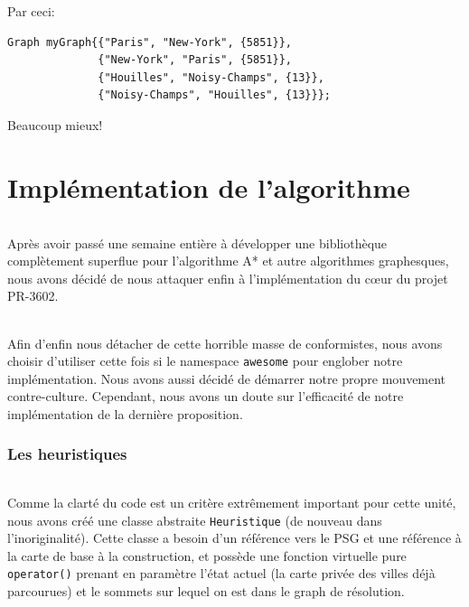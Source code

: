 \documentclass[french]{article}
\begin{document}
Par ceci:

\begin{listing}[H]
\begin{verbatim}
Graph myGraph{{"Paris", "New-York", {5851}},
              {"New-York", "Paris", {5851}},
              {"Houilles", "Noisy-Champs", {13}},
              {"Noisy-Champs", "Houilles", {13}}};
\end{verbatim}
\caption{Beaucoup mieux!}
\label{tsp:better}
\end{listing}

\part{Implémentation de l'algorithme}

\paragraph{} Après avoir passé une semaine entière à développer une
bibliothèque complètement superflue pour l'algorithme A* et autre algorithmes
graphesques, nous avons décidé de nous attaquer enfin à l'implémentation du
cœur du projet PR-3602.

\paragraph{} Afin d'enfin nous détacher de cette horrible masse de
conformistes, nous avons choisir d'utiliser cette fois si le namespace
\texttt{awesome} pour englober notre implémentation. Nous avons aussi décidé de
démarrer notre propre mouvement contre-culture. Cependant, nous avons un doute
sur l'efficacité de notre implémentation de la dernière proposition.

\section{Les heuristiques}

\paragraph{} Comme la clarté du code est un critère extrêmement important pour
cette unité, nous avons créé une classe abstraite \texttt{Heuristique} (de
nouveau dans l'inoriginalité). Cette classe a besoin d'un référence vers le PSG
et une référence à la carte de base à la construction, et possède une fonction
virtuelle pure \texttt{operator()} prenant en paramètre l'état actuel
(la carte privée des villes déjà parcourues) et le sommets sur lequel on est
dans le graph de résolution.
\end{document}

